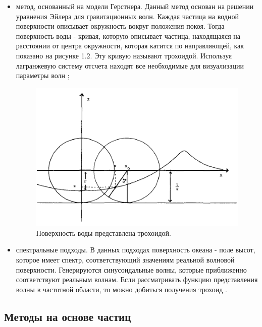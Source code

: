 \begin{itemize}
    \item метод, основанный на модели Герстнера. Данный метод основан на решении уравнения Эйлера для гравитационных волн. Каждая частица на водной поверхности описывает окружность вокруг положения покоя. Тогда поверхность воды - кривая, которую описывает частица, находящаяся на расстоянии от центра окружности, которая катится по направляющей, как показано на рисунке 1.2. Эту кривую называют трохоидой. Используя лагранжевую систему отсчета находят все необходимые для визуализации параметры волн \cite{orbit-procedure};

\begin{figure}[H]
	\begin{center}
		\includegraphics[scale=0.3]{img/trochoid.png}
	\end{center}
	\captionsetup{justification=centering}
	\caption{Поверхность воды представлена трохоидой.}
	\label{img:trochoid}
\end{figure}

    \item спектральные подходы. В данных подходах поверхность океана - поле высот, которое имеет спектр, соответствующий значениям реальной волновой поверхности. Генерируются синусоидальные волны, которые приближенно соответствуют реальным волнам. Если рассматривать функцию представления волны в частотной области, то можно добиться получения трохоид \cite{spectrum-darles}\cite{spectrum-tessendorf}.
\end{itemize}

\subsection{Методы на основе частиц}

